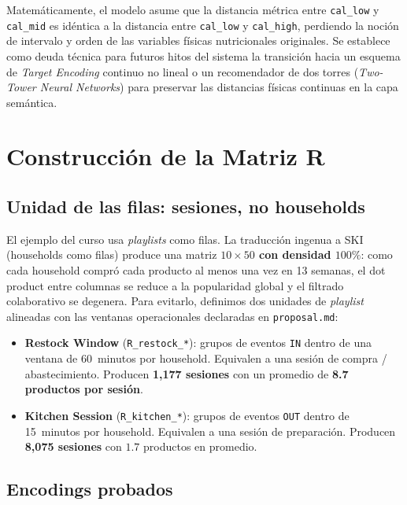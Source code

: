 \documentclass[12pt,a4paper]{article}
\newcommand{\metric}[1]{\textcolor{metricblue}{\textbf{#1}}}
\newcommand{\code}[1]{\texttt{\small #1}}
\begin{document}
Matemáticamente, el modelo asume que la distancia métrica entre \code{cal\_low} y \code{cal\_mid} es idéntica a la distancia entre \code{cal\_low} y \code{cal\_high}, perdiendo la noción de intervalo y orden de las variables físicas nutricionales originales. Se establece como deuda técnica para futuros hitos del sistema la transición hacia un esquema de \textit{Target Encoding} continuo no lineal o un recomendador de dos torres (\textit{Two-Tower Neural Networks}) para preservar las distancias físicas continuas en la capa semántica.

\section{Construcción de la Matriz R}
\label{sec:R}

\subsection{Unidad de las filas: sesiones, no households}

El ejemplo del curso usa \textit{playlists} como filas. La traducción ingenua a SKI (households como filas) produce una matriz \metric{$10\times 50$ con densidad $100\%$}: como cada household compró cada producto al menos una vez en 13 semanas, el dot product entre columnas se reduce a la popularidad global y el filtrado colaborativo se degenera. Para evitarlo, definimos dos unidades de \textit{playlist} alineadas con las ventanas operacionales declaradas en \code{proposal.md}:

\begin{itemize}
    \item \textbf{Restock Window} (\code{R\_restock\_*}): grupos de eventos \code{IN} dentro de una ventana de 60~minutos por household. Equivalen a una sesión de compra / abastecimiento. Producen \metric{1{,}177 sesiones} con un promedio de \metric{8.7 productos por sesión}.
    \item \textbf{Kitchen Session} (\code{R\_kitchen\_*}): grupos de eventos \code{OUT} dentro de 15~minutos por household. Equivalen a una sesión de preparación. Producen \metric{8{,}075 sesiones} con $1.7$ productos en promedio.
\end{itemize}

\subsection{Encodings probados}
\label{sec:encodings}
\end{document}

